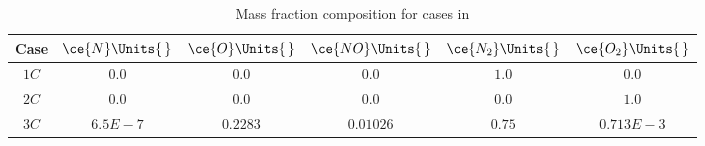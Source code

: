     \begin{table}[H]
        \centering
        \begin{tabular}{|c|c|c|c|c|c|}
            \hline
            Case  & $\ce{N}\Units{\,}$ & $\ce{O}\Units{\,}$ &
            $\ce{NO}\Units{\,}$ & $\ce{N_2}\Units{\,}$ &
            $\ce{O_2}\Units{\,}$ \\ \hline\hline
            $1C$ & $0.0$ & $0.0$ & $0.0$ & $1.0$ & $0.0$ \\ \hline
            $2C$ & $0.0$ & $0.0$ & $0.0$ & $0.0$ & $1.0$ \\ \hline
            $3C$ & $6.5E-7$ & $0.2283$ & $0.01026$ & $0.75$ & $0.713E\!-\!3$ \\ \hline
        \end{tabular}
        \caption{Mass fraction composition for cases in
        }\label{tab:chemistryCompositionMassFractionConditions}
    \end{table}

